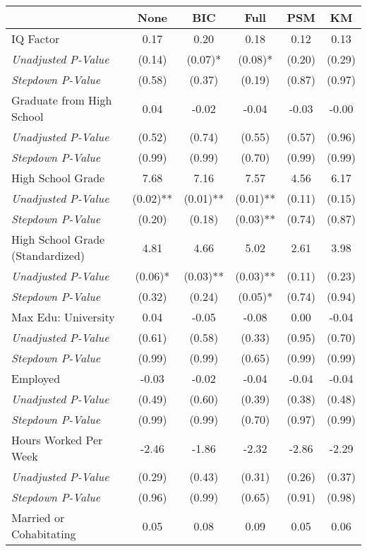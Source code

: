 \begin{tabular}{l c c c c c}
\toprule
 & None & BIC & Full & PSM & KM \\
\midrule
IQ Factor & 0.17 & 0.20 & 0.18 & 0.12 & 0.13 \\
\quad \textit{Unadjusted P-Value} & (0.14) & (0.07)* & (0.08)* & (0.20) & (0.29) \\
\quad \textit{Stepdown P-Value} & (0.58) & (0.37) & (0.19) & (0.87) & (0.97) \\
Graduate from High School & 0.04 & -0.02 & -0.04 & -0.03 & -0.00 \\
\quad \textit{Unadjusted P-Value} & (0.52) & (0.74) & (0.55) & (0.57) & (0.96) \\
\quad \textit{Stepdown P-Value} & (0.99) & (0.99) & (0.70) & (0.99) & (0.99) \\
High School Grade & 7.68 & 7.16 & 7.57 & 4.56 & 6.17 \\
\quad \textit{Unadjusted P-Value} & (0.02)** & (0.01)** & (0.01)** & (0.11) & (0.15) \\
\quad \textit{Stepdown P-Value} & (0.20) & (0.18) & (0.03)** & (0.74) & (0.87) \\
High School Grade (Standardized) & 4.81 & 4.66 & 5.02 & 2.61 & 3.98 \\
\quad \textit{Unadjusted P-Value} & (0.06)* & (0.03)** & (0.03)** & (0.11) & (0.23) \\
\quad \textit{Stepdown P-Value} & (0.32) & (0.24) & (0.05)* & (0.74) & (0.94) \\
Max Edu: University & 0.04 & -0.05 & -0.08 & 0.00 & -0.04 \\
\quad \textit{Unadjusted P-Value} & (0.61) & (0.58) & (0.33) & (0.95) & (0.70) \\
\quad \textit{Stepdown P-Value} & (0.99) & (0.99) & (0.65) & (0.99) & (0.99) \\
Employed & -0.03 & -0.02 & -0.04 & -0.04 & -0.04 \\
\quad \textit{Unadjusted P-Value} & (0.49) & (0.60) & (0.39) & (0.38) & (0.48) \\
\quad \textit{Stepdown P-Value} & (0.99) & (0.99) & (0.70) & (0.97) & (0.99) \\
Hours Worked Per Week & -2.46 & -1.86 & -2.32 & -2.86 & -2.29 \\
\quad \textit{Unadjusted P-Value} & (0.29) & (0.43) & (0.31) & (0.26) & (0.37) \\
\quad \textit{Stepdown P-Value} & (0.96) & (0.99) & (0.65) & (0.91) & (0.98) \\
Married or Cohabitating & 0.05 & 0.08 & 0.09 & 0.05 & 0.06 \\

\end{tabular}

